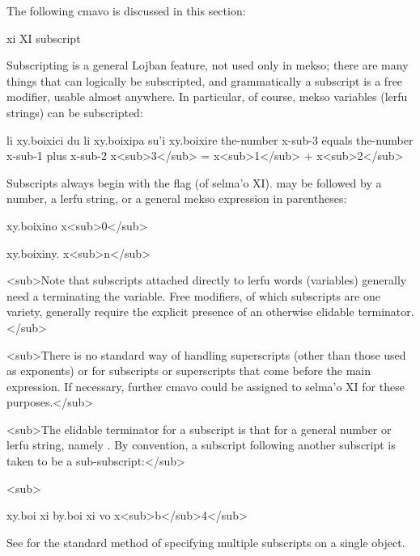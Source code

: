 The following cmavo is discussed in this section:

   xi  XI  subscript

Subscripting is a general Lojban feature, not used only in
    mekso; there are many things that can logically be subscripted,
    and grammatically a subscript is a free modifier, usable almost
    anywhere. In particular, of course, mekso variables (lerfu
    strings) can be subscripted:
\begin{example}
li xy.boixici du li xy.boixipa su'i xy.boixire\n
the-number x-sub-3 equals the-number x-sub-1 plus x-sub-2\n
x<sub>3</sub>  = x<sub>1</sub>  + x<sub>2</sub>
\end{example}

Subscripts always begin with the flag  (of selma'o XI).
     may be followed by a number, a lerfu string, or a
    general mekso expression in parentheses:
\begin{example}
xy.boixino\n
x<sub>0</sub>
\end{example}

\begin{example}
xy.boixiny.\n
x<sub>n</sub>
\end{example}

\begin{example}
xy.boixi vei ny. su'i pa \n
x<sub>n+1}
</sub>
\end{example}

<sub>Note that subscripts attached directly to lerfu words
    (variables) generally need a  terminating the variable.
    Free modifiers, of which subscripts are one variety, generally
    require the explicit presence of an otherwise elidable
    terminator.</sub>

<sub>There is no standard way of handling superscripts
    (other than those used as exponents) or for subscripts or
    superscripts that come before the main expression. If
    necessary, further cmavo could be assigned to selma'o XI for
    these purposes.</sub>

<sub>The elidable terminator for a subscript is that for a
    general number or lerfu string, namely . By convention,
    a subscript following another subscript is taken to be a
    sub-subscript:</sub>

<sub>
\begin{example}
xy.boi xi by.boi xi vo\n
x<sub>b</sub>4</sub>
\end{example}

See  for the standard
    method of specifying multiple subscripts on a single
    object.

